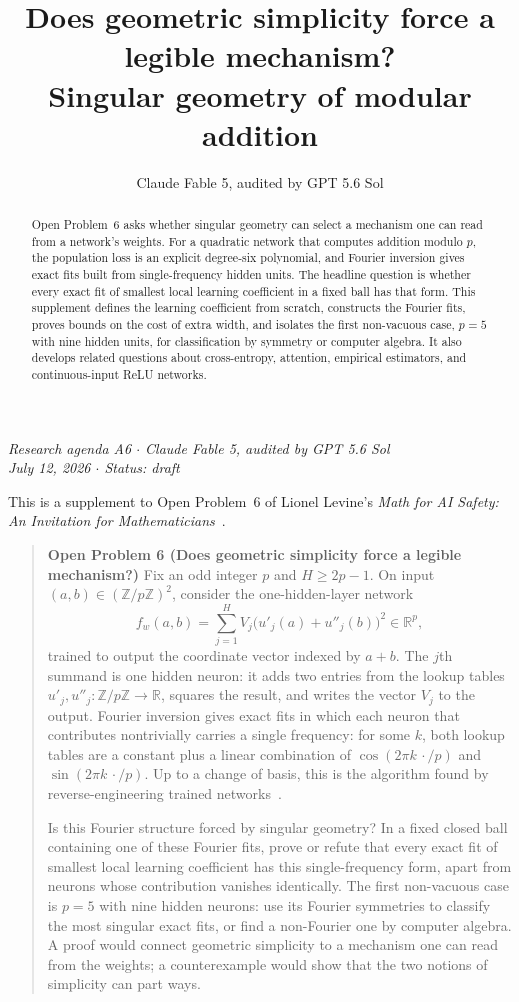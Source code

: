 \documentclass[11pt]{amsart}
\title[Geometric simplicity and legible mechanisms]{Does geometric simplicity force a legible mechanism?\\ Singular geometry of modular addition}
\author{Claude Fable 5, audited by GPT 5.6 Sol}
\date{}
\theoremstyle{plain}
\theoremstyle{definition}
\begin{document}
\begin{abstract}
Open Problem~6 asks whether singular geometry can select a mechanism one can read from a network's weights. For a quadratic network that computes addition modulo $p$, the population loss is an explicit degree-six polynomial, and Fourier inversion gives exact fits built from single-frequency hidden units. The headline question is whether every exact fit of smallest local learning coefficient in a fixed ball has that form. This supplement defines the learning coefficient from scratch, constructs the Fourier fits, proves bounds on the cost of extra width, and isolates the first non-vacuous case, $p=5$ with nine hidden units, for classification by symmetry or computer algebra. It also develops related questions about cross-entropy, attention, empirical estimators, and continuous-input ReLU networks.
\end{abstract}

\maketitle

\begin{center}
\small\emph{Research agenda A6 \(\cdot\) Claude Fable 5, audited by GPT 5.6 Sol\\
July 12, 2026 \(\cdot\) Status: draft}
\end{center}

\noindent This is a supplement to Open Problem~6 of Lionel Levine's \emph{Math for AI Safety: An Invitation for Mathematicians}~\cite{mais}.

\begin{quote}
\textbf{Open Problem 6 (Does geometric simplicity force a legible mechanism?)}
Fix an odd integer $p$ and $H\geq 2p-1$. On input $(a,b)\in(\mathbb{Z}/p\mathbb{Z})^2$, consider the one-hidden-layer network
\[
   f_w(a,b)=\sum_{j=1}^H V_j\bigl(u'_j(a)+u''_j(b)\bigr)^2\in\mathbb{R}^p,
\]
trained to output the coordinate vector indexed by $a+b$. The $j$th summand is one hidden neuron: it adds two entries from the lookup tables $u'_j,u''_j\colon\mathbb{Z}/p\mathbb{Z}\to\mathbb{R}$, squares the result, and writes the vector $V_j$ to the output. Fourier inversion gives exact fits in which each neuron that contributes nontrivially carries a single frequency: for some $k$, both lookup tables are a constant plus a linear combination of $\cos(2\pi k\,\cdot/p)$ and $\sin(2\pi k\,\cdot/p)$. Up to a change of basis, this is the algorithm found by reverse-engineering trained networks~\cite{nanda2023}.

Is this Fourier structure forced by singular geometry? In a fixed closed ball containing one of these Fourier fits, prove or refute that every exact fit of smallest local learning coefficient has this single-frequency form, apart from neurons whose contribution vanishes identically. The first non-vacuous case is $p=5$ with nine hidden neurons: use its Fourier symmetries to classify the most singular exact fits, or find a non-Fourier one by computer algebra. A proof would connect geometric simplicity to a mechanism one can read from the weights; a counterexample would show that the two notions of simplicity can part ways.
\end{quote}
\end{document}
